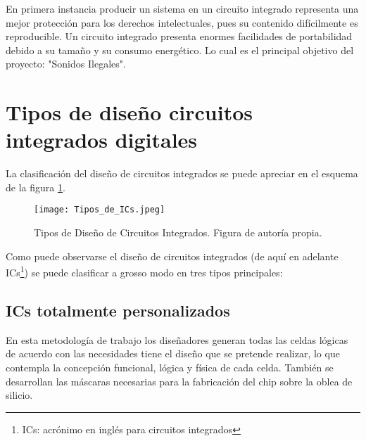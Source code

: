 En primera instancia producir un sistema en un circuito integrado representa una mejor protección para los derechos intelectuales, pues su contenido difícilmente es reproducible. Un circuito integrado presenta enormes facilidades de portabilidad debido a su tamaño y su consumo energético. Lo cual es el principal objetivo del proyecto: "Sonidos Ilegales".

%

\section{Tipos de diseño circuitos integrados digitales}

La clasificación del diseño de circuitos integrados se puede apreciar en el esquema de la figura \ref{ICs}.

\begin{figure}[h]
\texttt{[image: Tipos\_de\_ICs.jpeg]}
\centering
\caption{Tipos de Diseño de Circuitos Integrados. Figura de autoría propia.}
\label{ICs}
\end{figure}
Como puede observarse el diseño de circuitos integrados (de aquí en adelante ICs\footnote{ICs: acrónimo en inglés para circuitos integrados}) se puede clasificar a grosso modo en tres tipos principales:

\subsection{\textbf{ICs totalmente personalizados}}

En esta metodología de trabajo los diseñadores generan todas las celdas lógicas de acuerdo con las necesidades tiene el diseño que se pretende realizar, lo que contempla la concepción funcional, lógica y física de cada celda. También se desarrollan las máscaras necesarias para la fabricación del chip sobre la oblea de silicio.

